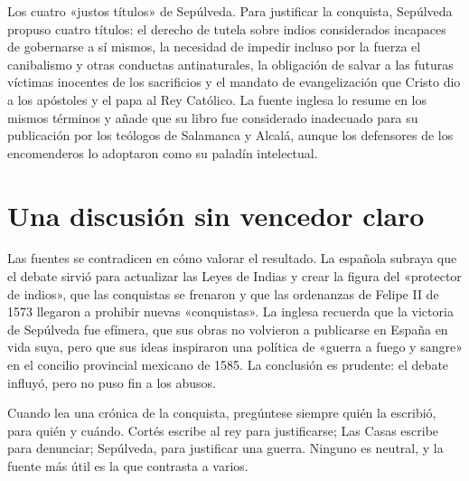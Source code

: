 \documentclass{book}
\begin{document}

Los cuatro «justos títulos» de Sepúlveda. Para justificar la conquista, Sepúlveda propuso cuatro títulos: el derecho de tutela sobre indios considerados incapaces de gobernarse a sí mismos, la necesidad de impedir incluso por la fuerza el canibalismo y otras conductas antinaturales, la obligación de salvar a las futuras víctimas inocentes de los sacrificios y el mandato de evangelización que Cristo dio a los apóstoles y el papa al Rey Católico. La fuente inglesa lo resume en los mismos términos y añade que su libro fue considerado inadecuado para su publicación por los teólogos de Salamanca y Alcalá, aunque los defensores de los encomenderos lo adoptaron como su paladín intelectual.


\section{Una discusión sin vencedor claro}

Las fuentes se contradicen en cómo valorar el resultado. La española subraya que el debate sirvió para actualizar las Leyes de Indias y crear la figura del «protector de indios», que las conquistas se frenaron y que las ordenanzas de Felipe II de 1573 llegaron a prohibir nuevas «conquistas». La inglesa recuerda que la victoria de Sepúlveda fue efímera, que sus obras no volvieron a publicarse en España en vida suya, pero que sus ideas inspiraron una política de «guerra a fuego y sangre» en el concilio provincial mexicano de 1585. La conclusión es prudente: el debate influyó, pero no puso fin a los abusos.


\begin{tcolorbox}[title={Consejo}, studiumtip, breakable]

Cuando lea una crónica de la conquista, pregúntese siempre quién la escribió, para quién y cuándo. Cortés escribe al rey para justificarse; Las Casas escribe para denunciar; Sepúlveda, para justificar una guerra. Ninguno es neutral, y la fuente más útil es la que contrasta a varios.

\end{tcolorbox}
\end{document}
